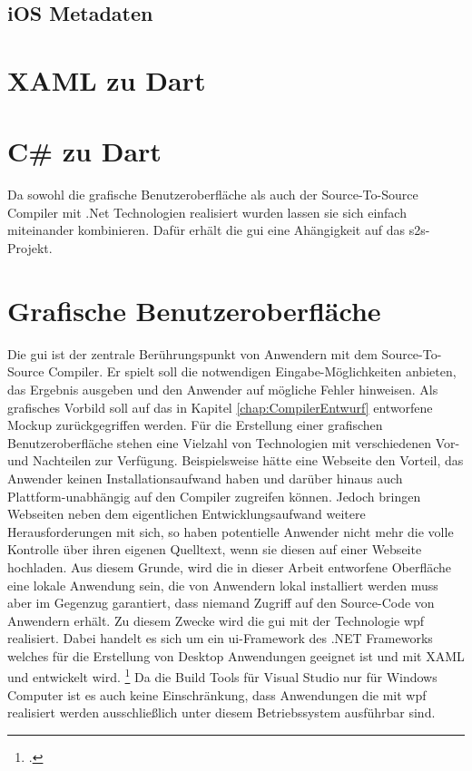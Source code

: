 \subsection{iOS Metadaten}




\section{XAML zu Dart}



\section{C\# zu Dart}


Da sowohl die grafische Benutzeroberfläche als auch der Source-To-Source Compiler mit .Net Technologien realisiert wurden lassen sie sich einfach miteinander kombinieren.  Dafür erhält die  \ac{gui} eine Ahängigkeit auf das \ac{s2s}-Projekt.  



\section{Grafische Benutzeroberfläche}
Die \ac{gui} ist der zentrale Berührungspunkt von Anwendern mit dem Source-To-Source Compiler.  Er spielt soll die notwendigen Eingabe-Möglichkeiten anbieten,  das Ergebnis ausgeben und den Anwender auf mögliche Fehler hinweisen.  Als grafisches Vorbild soll auf das in Kapitel \ref{chap:CompilerEntwurf} entworfene Mockup zurückgegriffen werden.  Für die Erstellung einer grafischen Benutzeroberfläche stehen eine Vielzahl von Technologien mit verschiedenen Vor- und Nachteilen zur Verfügung.  Beispielsweise hätte eine Webseite den Vorteil,  das Anwender keinen Installationsaufwand haben und darüber hinaus auch Plattform-unabhängig auf den Compiler zugreifen können.  Jedoch bringen Webseiten neben dem eigentlichen Entwicklungsaufwand weitere Herausforderungen mit sich,  so haben potentielle Anwender nicht mehr die volle Kontrolle über ihren eigenen Quelltext, wenn sie diesen auf einer Webseite hochladen.  
Aus diesem Grunde,  wird die in dieser Arbeit entworfene Oberfläche eine lokale Anwendung sein,  die von Anwendern lokal installiert werden muss aber im Gegenzug garantiert,  dass niemand Zugriff auf den Source-Code von Anwendern erhält.  Zu diesem Zwecke wird die \ac{gui} mit der Technologie \ac{wpf} realisiert.  Dabei handelt es sich um ein \ac{ui}-Framework des .NET Frameworks welches für die Erstellung von Desktop Anwendungen geeignet ist und mit XAML und \Csharp entwickelt wird.  \footcite[Vgl.][S. 1f]{Wenger2012} Da die Build Tools für Visual Studio nur für Windows Computer ist es auch keine Einschränkung,  dass Anwendungen die mit \ac{wpf} realisiert werden ausschließlich unter diesem Betriebssystem ausführbar sind.

